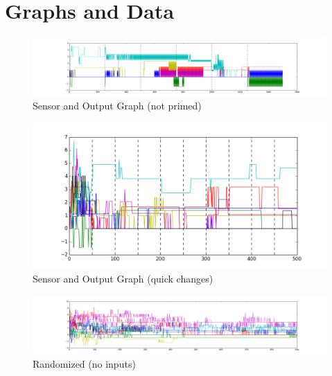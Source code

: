 \documentclass[12pt]{article}
\begin{document}
\newpage

\section{Graphs and Data} \label{graphs}

\begin{figure}[H]
    \centering
    \includegraphics[width=\textheight,angle=270,keepaspectratio]{../visualizations/8knodes_unrandomized.png}
    \caption{Sensor and Output Graph (not primed)}
\end{figure}

\begin{figure}[H]
    \centering
    \includegraphics[width=\textheight,angle=270,keepaspectratio]{../visualizations/8knodes_quick_changes.png}
    \caption{Sensor and Output Graph (quick changes)}
\end{figure}

\begin{figure}[H]
    \centering
    \includegraphics[width=\textheight,angle=270,keepaspectratio]{../visualizations/8knodes_stable_line.png}
    \caption{Randomized (no inputs)}
\end{figure}
\end{document}
